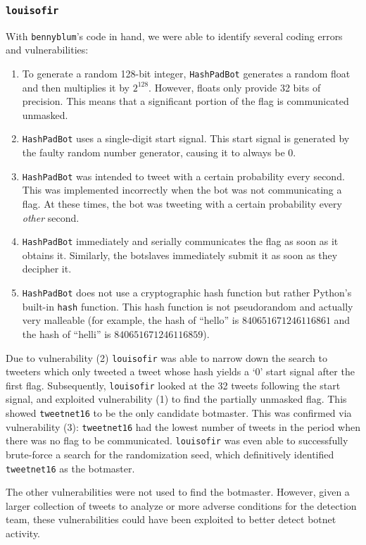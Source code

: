 \documentclass[11pt, oneside]{article} %
\numberwithin{equation}{section} %
\numberwithin{figure}{section} %
\numberwithin{table}{section} %
\renewcommand{\c}[1]{\texttt{#1}}
\newcommand{\teambb}{\c{bennyblum}}
\newcommand{\teamol}{\c{louisofir}}
\begin{document}
		\subsubsection{\teamol{}}
			With \teambb{}'s code in hand, we were able to identify several coding errors and vulnerabilities:  
			\begin{enumerate}
				\item To generate a random 128-bit integer, \c{HashPadBot} generates a random float and then multiplies it by $2^{128}$.  However, floats only provide 32 bits of precision.  This means that a significant portion of the flag is communicated unmasked.
				\item \c{HashPadBot} uses a single-digit start signal.  This start signal is generated by the faulty random number generator, causing it to always be $0$.
				\item \c{HashPadBot} was intended to tweet with a certain probability every second.  This was implemented incorrectly when the bot was not communicating a flag.  At these times, the bot was tweeting with a certain probability every \emph{other} second.
				\item \c{HashPadBot} immediately and serially communicates the flag as soon as it obtains it.  Similarly, the botslaves immediately submit it as soon as they decipher it.
				\item \c{HashPadBot} does not use a cryptographic hash function but rather Python's built-in \c{hash} function.  This hash function is not pseudorandom and actually very malleable (for example, the hash of ``hello'' is $840651671246116861$ and the hash of ``helli'' is $840651671246116859$).
			\end{enumerate}
			Due to vulnerability (2) \teamol{} was able to narrow down the search to tweeters which only tweeted a tweet whose hash yields a `0' start signal after the first flag.  Subsequently, \teamol{} looked at the 32 tweets following the start signal, and exploited vulnerability (1) to find the partially unmasked flag.  This showed \c{tweetnet16} to be the only candidate botmaster.  This was confirmed via vulnerability (3): \c{tweetnet16} had the lowest number of tweets in the period when there was no flag to be communicated.  \teamol{} was even able to successfully brute-force a search for the randomization seed, which definitively identified \c{tweetnet16} as the botmaster.

			The other vulnerabilities were not used to find the botmaster.  However, given a larger collection of tweets to analyze or more adverse conditions for the detection team, these vulnerabilities could have been exploited to better detect botnet activity.
\end{document}
